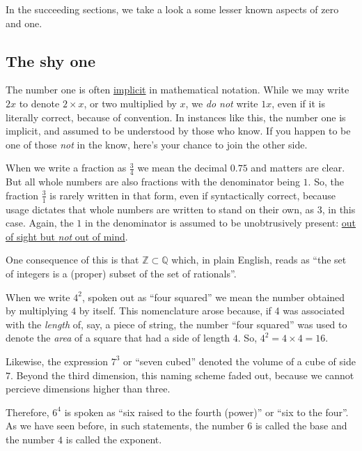 \documentclass[
  a4paper,
]{article}
\begin{document}
In the succeeding sections, we take a look a some lesser known aspects
of zero and one.

\hypertarget{the-shy-one}{%
\subsection{The shy one}\label{the-shy-one}}

The number one is often
\href{https://www.vocabulary.com/dictionary/implicit}{implicit} in
mathematical notation. While we may write \(2x\) to denote
\(2\times x\), or two multiplied by \(x\), we \emph{do not} write
\(1x\), even if it is literally correct, because of convention. In
instances like this, the number one is implicit, and assumed to be
understood by those who know. If you happen to be one of those
\emph{not} in the know, here's your chance to join the other side.

When we write a fraction as \(\frac{3}{4}\) we mean the decimal \(0.75\)
and matters are clear. But all whole numbers are also fractions with the
denominator being \(1\). So, the fraction \(\frac{3}{1}\) is rarely
written in that form, even if syntactically correct, because usage
dictates that whole numbers are written to stand on their own, as \(3\),
in this case. Again, the \(1\) in the denominator is assumed to be
unobtrusively present:
\href{https://dictionary.cambridge.org/dictionary/english/out-of-sight-out-of-mind}{out
of sight but \emph{not} out of mind}.

One consequence of this is that \(\mathbb{Z} \subset \mathbb{Q}\) which,
in plain English, reads as ``the set of integers is a (proper) subset of
the set of rationals''.

When we write \(4^2\), spoken out as ``four squared'' we mean the number
obtained by multiplying \(4\) by itself. This nomenclature arose
because, if 4 was associated with the \emph{length} of, say, a piece of
string, the number ``four squared'' was used to denote the \emph{area}
of a square that had a side of length \(4\). So,
\(4^2 = 4\times4 = 16\).

Likewise, the expression \(7^3\) or ``seven cubed'' denoted the volume
of a cube of side \(7\). Beyond the third dimension, this naming scheme
faded out, because we cannot percieve dimensions higher than three.

Therefore, \(6^4\) is spoken as ``six raised to the fourth (power)'' or
``six to the four''. As we have seen before, in such statements, the
number \(6\) is called the base and the number \(4\) is called the
exponent.
\end{document}
